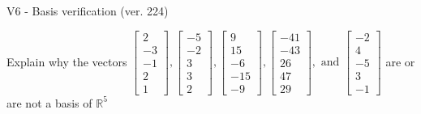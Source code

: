 \begin{exercise}
  \begin{exerciseTitle}V6 - Basis verification (ver. 224)\end{exerciseTitle}
  \begin{exerciseStatement}
    Explain why the vectors \(\left[\begin{array}{r}
2 \\
-3 \\
-1 \\
2 \\
1
\end{array}\right] , \left[\begin{array}{r}
-5 \\
-2 \\
3 \\
3 \\
2
\end{array}\right] , \left[\begin{array}{r}
9 \\
15 \\
-6 \\
-15 \\
-9
\end{array}\right] , \left[\begin{array}{r}
-41 \\
-43 \\
26 \\
47 \\
29
\end{array}\right] , \text{ and } \left[\begin{array}{r}
-2 \\
4 \\
-5 \\
3 \\
-1
\end{array}\right]\) are or are not a basis of \(\mathbb{R}^5\)	



\end{exerciseStatement}
\end{exercise}
